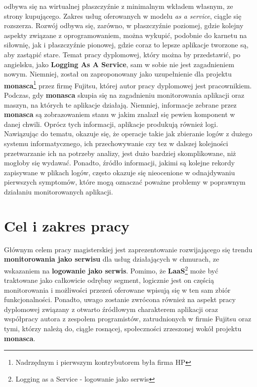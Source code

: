 odbywa się na wirtualnej płaszczyźnie z minimalnym wkładem własnym, ze strony kupującego. Zakres usług oferowanych w modelu \textit{as a service}, ciągle
się rozszerza. Rozwój odbywa się, zarówno, w płaszczyźnie poziomej, gdzie kolejny aspekty związane z oprogramowaniem, można wykupić, podobnie do karnetu 
na siłownię, jak i płaszczyźnie pionowej, gdzie coraz to lepsze aplikacje tworzone są, aby zastąpić stare. 
Temat pracy dyplomowej, który można by przedstawić, po angielsku, jako \textbf{Logging As A Service}, sam w sobie nie jest zagadnieniem
nowym. Niemniej, został on zaproponowany jako uzupełnienie dla projektu \textbf{monasca}\footnote{Nadrzędnym i pierwszym kontrybutorem była firma HP} przez
firmę Fujitsu, której autor pracy dyplomowej jest pracownikiem. 
Podczas, gdy \textbf{monasca} skupia się na zagadnieniu monitorowania aplikacji oraz maszyn, na których te aplikacje działają. Niemniej, informacje
zebrane przez \textbf{monasca} są zobrazowaniem stanu w jakim znalazł się pewien komponent w danej chwili. Oprócz tych informacji, aplikacje produkują
również logi. Nawiązując do tematu, okazuje się, że operacje takie jak zbieranie logów z dużego systemu informatycznego, ich przechowywanie
czy tez w dalszej kolejności przetwarzanie ich na potrzeby analizy, jest dużo bardziej skomplikowane, niż mogłoby się wydawać. 
Ponadto, źródło informacji, jakimi są kolejne rekordy zapisywane w plikach logów, często okazuje się nieocenione w odnajdywaniu
pierwszych symptomów, które mogą oznaczać poważne problemy w poprawnym działaniu monitorowanych aplikacji.

\section{Cel i zakres pracy}

Głównym celem pracy magisterskiej jest zaprezentowanie rozwijającego się trendu \textbf{monitorowania jako serwisu} dla usług działających w chmurach,
ze wskazaniem na \textbf{logowanie jako serwis}. Pomimo, że \textbf{LaaS}\footnote{Logging as a Service - logowanie jako serwis} 
może być traktowane jako całkowicie odrębny segment, logicznie jest on częścią monitorowania i możliwości przezeń oferowane wpisują się w ten sam
zbiór funkcjonalności. 
Ponadto, uwago zostanie zwrócona również na aspekt pracy dyplomowej związany z otwarto źródłowym charakterem aplikacji oraz
współpracy autora z zespołem programistów, zatrudnionych w firmie Fujitsu oraz tymi, którzy należą do, ciągle rosnącej, społeczności zrzeszonej wokół projektu \textbf{monasca}. 

